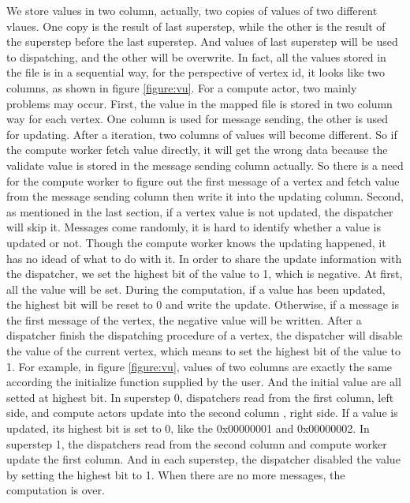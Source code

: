 \documentclass[twocolumn,a4paper,10pt]{article}
\begin{document}
We store values in two column, actually, two copies of values of two different vlaues. One copy is the result of last superstep, while the other is the result of the superstep before the last superstep. And values of last superstep will be used to dispatching, and the other will be overwrite. In fact, all the values stored in the file is in a sequential way, for the perspective of vertex id, it looks like two columns, as shown in figure \ref{figure:vu}. \newline
For a compute actor, two mainly problems may occur. First, the value in the mapped file is stored in two column way for each vertex. One column is used for message sending, the other is used for updating. After a iteration,  two columns of values will become different. So if the compute worker fetch value directly, it will get the wrong data because the validate value is stored in the message sending column actually. So there is a need for the compute worker to figure out the first message of a vertex and fetch value from the message sending column then write it into the updating column. \newline
Second, as mentioned in the last section, if a vertex value is not updated, the dispatcher will skip it. Messages come randomly, it is hard to identify whether a value is updated or not. Though the compute worker knows the updating happened, it has no idead of what to do with it. In order to share the update information with the dispatcher, we set the highest bit of the value to 1, which is negative. At first, all the value will be set. During the computation, if a value has been updated, the highest bit will be reset to 0 and write the update. Otherwise, if a message is the first message of the vertex, the negative value will be written. After a dispatcher finish the dispatching procedure of a vertex, the dispatcher will disable the value of the current vertex, which means to set the highest bit of the value to 1. For example, in figure \ref{figure:vu}, values of two columns are exactly the same according the initialize function supplied by the user. And the initial value are all setted at highest bit. In superstep 0, dispatchers read from the first column, left side, and compute actors update into the second column , right side. If a value is updated, its highest bit is set to 0, like the 0x00000001 and 0x00000002. In superstep 1, the dispatchers read from the second column and compute worker update the first column. And in each superstep, the dispatcher disabled the value by setting the highest bit to 1. When there are no more messages, the computation is over.
\end{document}
